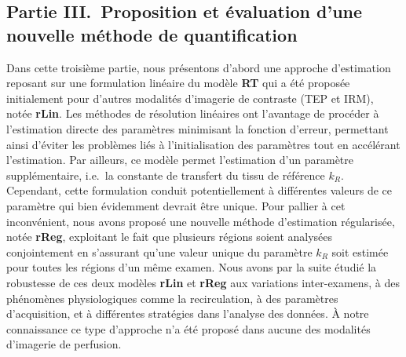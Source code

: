 \begin{otherlanguage}{francais}
\subsection*{Partie III.~Proposition et \'evaluation d'une nouvelle m\'ethode de quantification}
Dans cette troisi\`eme partie, nous pr\'esentons d'abord une approche d'estimation reposant sur une formulation lin\'eaire du mod\`ele \textbf{RT} qui a \'et\'e propos\'ee initialement pour d'autres modalit\'es d'imagerie de contraste (TEP et IRM), not\'ee \textbf{rLin}.
Les m\'ethodes de r\'esolution lin\'eaires ont l'avantage de proc\'eder \`a l'estimation directe des param\`etres minimisant la fonction d'erreur, permettant ainsi d'\'eviter les probl\`emes li\'es \`a l'initialisation des param\`etres tout en acc\'el\'erant l'estimation.
Par ailleurs, ce mod\`ele permet l'estimation d'un param\`etre suppl\'ementaire, i.e.~la constante de transfert du tissu de r\'ef\'erence $k_R$.
Cependant, cette formulation conduit potentiellement \`a diff\'erentes valeurs de ce param\`etre qui bien \'evidemment devrait \^etre unique.
Pour pallier \`a cet inconv\'enient, nous avons propos\'e une nouvelle m\'ethode d'estimation r\'egularis\'ee, not\'ee \textbf{rReg}, exploitant le fait que plusieurs r\'egions soient analys\'ees conjointement en s'assurant qu'une valeur unique du param\`etre $k_R$ soit estim\'ee pour toutes les r\'egions d'un m\^eme examen.
Nous avons par la suite \'etudi\'e la robustesse de ces deux mod\`eles \textbf{rLin} et \textbf{rReg} aux variations inter-examens, \`a des ph\'enom\`enes physiologiques comme la recirculation, \`a des param\`etres d'acquisition, et \`a diff\'erentes strat\'egies dans l'analyse des donn\'ees. 
\`A notre connaissance ce type d'approche n'a \'et\'e propos\'e dans aucune des modalit\'es d'imagerie de perfusion.


\end{otherlanguage}
